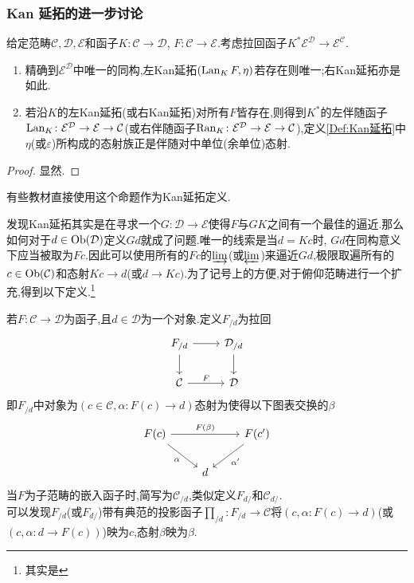 \subsubsection{Kan 延拓的进一步讨论}
\begin{proposition}\label{Pro:Kan延拓定义}
    给定范畴$\mathcal{C},\mathcal{D},\mathcal{E}$和函子$K \colon \mathcal{C} \to \mathcal{D}$, $F \colon\mathcal{C} \to \mathcal{E}$.考虑拉回函子$K^* \mathcal{E}^{\mathcal{D}} \to \mathcal{E}^{\mathcal{C}}$.
    \begin{enumerate}
        \item 精确到$\mathcal{E}^{\mathcal{D}}$中唯一的同构,左Kan延拓$(\operatorname{Lan}_KF,\eta)$若存在则唯一;右Kan延拓亦是如此.
        \item 若沿$K$的左Kan延拓(或右Kan延拓)对所有$F$皆存在,则得到$K^*$的左伴随函子$\operatorname{Lan}_K \colon \mathcal{E}^{\mathcal{D}}\to \mathcal{E} \to \mathcal{C}$(或右伴随函子$\operatorname{Ran}_K \colon \mathcal{E}^{\mathcal{D}}\to \mathcal{E} \to \mathcal{C}$),定义\ref{Def:Kan延拓}中$\eta$(或$\varepsilon$)所构成的态射族正是伴随对中单位(余单位)态射.
    \end{enumerate}
\end{proposition}
\begin{proof}
    显然.
\end{proof}
\begin{remark}
    有些教材直接使用这个命题作为Kan延拓定义.
\end{remark}
发现Kan延拓其实是在寻求一个$G \colon \mathcal{D} \to \mathcal{E}$使得$F$与$GK$之间有一个最佳的逼近.那么如何对于$d \in \operatorname{Ob}(\mathcal{D})$定义$Gd$就成了问题.唯一的线索是当$d = Kc$时, $Gd$在同构意义下应当被取为$Fc$.因此可以使用所有的$Fc$的$\underrightarrow{\lim}$(或$\underleftarrow{\lim}$)来逼近$Gd$,极限取遍所有的$c \in \operatorname{Ob}(\mathcal{C})$和态射$Kc \to d$(或$d \to Kc)$.为了记号上的方便,对于俯仰范畴进行一个扩充,得到以下定义.\footnote{其实是\parencite[定义1.6.2]{李文威卷二}}
\begin{definition}
    若$F \colon \mathcal{C} \to \mathcal{D}$为函子,且$d \in \mathcal{D}$为一个对象.定义$F_{/d}$为拉回
    \[\begin{tikzcd}
	{F_{/d}} & {\mathcal{D}_{/d}} \\
	{\mathcal{C}} & {\mathcal{D}}
	\arrow[from=1-1, to=1-2]
	\arrow[from=1-1, to=2-1]
	\arrow[from=1-2, to=2-2]
	\arrow["F", from=2-1, to=2-2]
    \end{tikzcd}\]
    即$F_{/d}$中对象为$(c\in \mathcal{C},\alpha \colon F(c) \to d)$态射为使得以下图表交换的$\beta$
    \[\begin{tikzcd}
	{F(c)} && {F(c')} \\
	& d
	\arrow["{F(\beta)}", from=1-1, to=1-3]
	\arrow["\alpha"', from=1-1, to=2-2]
	\arrow["{\alpha'}", from=1-3, to=2-2]
    \end{tikzcd}\]
    当$F$为子范畴的嵌入函子时,简写为$\mathcal{C}_{/d}$,类似定义$F_{d/}$和$\mathcal{C}_{d/}$.\\
    可以发现$F_{/d}$(或$F_{d/}$)带有典范的投影函子$\prod_{/d}\colon F_{/d} \to \mathcal{C}$将$(c,\alpha\colon F(c) \to d)$(或$(c,\alpha\colon d \to F(c))$)映为$c$,态射$\beta$映为$\beta$.
\end{definition}
